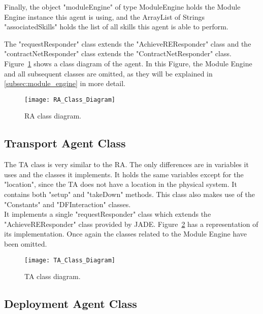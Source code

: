 Finally, the object "moduleEngine" of type ModuleEngine holds the Module Engine instance this agent is using, and the ArrayList of Strings "associatedSkills" holds the list of all skills this agent is able to perform.

The "requestResponder" class extends the "AchieveREResponder" class and the "contractNetResponder" class extends the "ContractNetResponder" class. Figure~\ref{fig:ra_class_diagram} shows a class diagram of the agent. In this Figure, the Module Engine and all subsequent classes are omitted, as they will be explained in \ref{subsec:module_engine} in more detail.\\

\begin{figure}[H]
	\centering
	\texttt{[image: RA\_Class\_Diagram]}
	\caption{\acrlong{RA} class diagram.}
	\label{fig:ra_class_diagram}
\end{figure}

\subsection{Transport Agent Class}
\label{subsec:transport_agent}

The \acrlong{TA} class is very similar to the \acrlong{RA}. The only differences are in variables it uses and the classes it implements. It holds the same variables except for the "location", since the \acrlong{TA} does not have a location in the physical system. It contains both "setup" and "takeDown" methods. This class also makes use of the "Constants" and "DFInteraction" classes.\\

It implements a single "requestResponder" class which extends the "AchieveREResponder" class provided by \acrshort{JADE}.
Figure~\ref{fig:ta_class_diagram} has a representation of its implementation. Once again the classes related to the Module Engine have been omitted.\\

\begin{figure}[h!]
	\centering
	\texttt{[image: TA\_Class\_Diagram]}
	\caption{\acrlong{TA} class diagram.}
	\label{fig:ta_class_diagram}
\end{figure}

\subsection{Deployment Agent Class}
\label{subsec:deployment_agent}

